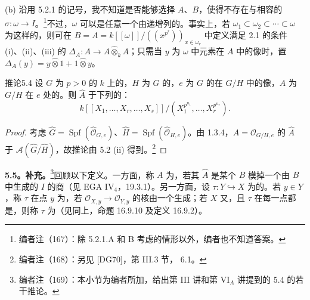 (b) 沿用 5.2.1 的记号，我不知道是否能够选择 $A$、$B$，使得不存在与相容的 $\sigma:\omega\to I$。\footnote{编者注（167）：除 5.2.1.A 和 B 考虑的情形以外，编者也不知道答案。}不过，$\omega$ 可以是任意一个由递增列的。事实上，若 $\omega_1\subset\omega_2\subset\cdots\subset\omega$ 为这样的，则可在 $B=A=k[[\omega]]/((x^{p^r}))_{x\in\omega_r}$ 中定义满足 2.1 的条件 (i)、(ii)、(iii) 的 $\Delta_A:A\to A\widehat\otimes_kA$；只需当 $y$ 为 $\omega$ 中元素在 $A$ 中的像时，置 $\Delta_A(y)=y\widehat\otimes1+1\widehat\otimes y$。

\begin{SGAresult}{推论}{5.4}
设 $G$ 为 $p>0$ 的 $k$ 上的，$H$ 为 $G$ 的，$e$ 为 $G$ 的在 $G/H$ 中的像，$A$ 为 $G/H$ 在 $e$ 处的。则 $\widehat A$ 于下列的：
\[k[[X_1,\ldots,X_r,\ldots,X_s]]/(X_1^{p^{n_1}},\ldots,X_r^{p^{n_r}}).\]
\end{SGAresult}
\begin{proof}
考虑 $\widehat G=\operatorname{Spf}(\widehat{\mathcal O}_{G,e})$、$\widehat H=\operatorname{Spf}(\widehat{\mathcal O}_{H,e})$。由 1.3.4，$A=\mathcal O_{G/H,e}$ 的 $\widehat A$ 于 $\mathcal A(\widehat G/\widehat H)$，故推论由 5.2 (ii) 得到。\footnote{编者注（168）：另见 [DG70]，第 III.3 节， 6.1。}
\end{proof}

\textbf{5.5。补充。}\footnote{编者注（169）：本小节为编者所加，给出第 III 讲和第 VI$_A$ 讲提到的 5.4 的若干推论。}回顾以下定义。一方面，称 $A$ 为，若其 $\widehat A$ 是某个 $B$ 模掉一个由 $B$ 中生成的 $I$ 的商（见 EGA IV$_4$，19.3.1）。另一方面，设 $\tau:Y\hookrightarrow X$ 为的。若 $y\in Y$，称 $\tau$ 在点 $y$ 为，若 $\mathcal O_{X,y}\to\mathcal O_{Y,y}$ 的核由一个生成；若 $X$ 又，且 $\tau$ 在每一点都是，则称 $\tau$ 为（见同上，命题 16.9.10 及定义 16.9.2）。

